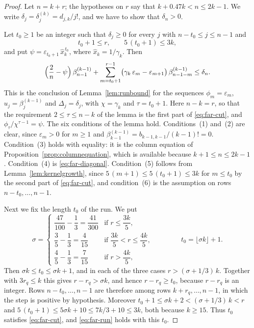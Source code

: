 \documentclass{amsart}
\theoremstyle{definition}
\theoremstyle{remark}
\numberwithin{equation}{section}
\begin{document}
\begin{proof}
Let $n=k+r$; the hypotheses on $r$ say that $k+0.47k<n\le2k-1$. We write
$\delta_j=\delta^{(k)}_j=d_{j,k}/j!$, and we have to show that $\delta_n>0$.

Let $t_0\ge1$ be an
integer such that $\delta_j\ge0$ for every $j$ with $n-t_0\le j\le n-1$ and
\begin{equation}\label{eq:far-cut}
t_0+1\le r,\qquad 5\,(t_0+1)\le3k,
\end{equation}
and put $\psi=\varepsilon_{t_0+1}\,\hat x_k^{\,t_0}$, where
$\hat x_k=1/\gamma_k$. Then
\begin{equation}\label{eq:far-run}
\Bigl(\frac2n-\psi\Bigr)\,\beta^{(k-1)}_{n-1}
+\sum_{m=t_0+1}^{r-1}\bigl(\gamma_k\,\varepsilon_m-\varepsilon_{m+1}\bigr)\,
\beta^{(k-1)}_{n-1-m}\le\delta_n .
\end{equation}
This is the conclusion of Lemma~\ref{lem:runbound} for the sequences
$\phi_m=\varepsilon_m$, $u_j=\beta^{(k-1)}_j$ and $\Delta_j=\delta_j$, with
$\chi=\gamma_k$ and $\tau=t_0+1$. Here $n-k=r$, so that the requirement
$2\le\tau\le n-k$ of the lemma is the first part of \eqref{eq:far-cut}, and
$\phi_\tau/\chi^{\tau-1}=\psi$. The six conditions of the lemma hold.
Conditions~(1) and~(2) are clear, since $\varepsilon_m>0$ for $m\ge1$ and
$\beta^{(k-1)}_{k-1}=b_{k-1,k-1}/(k-1)!=0$.
Condition~(3) holds with equality: it is the column equation of
Proposition~\ref{prop:columnequation}, which is available because
$k+1\le n\le2k-1$. Condition~(4) is \eqref{eq:far-diagonal}. Condition~(5)
follows from Lemma~\ref{lem:kernelgrowth}, since
$5\,(m+1)\le5\,(t_0+1)\le3k$ for $m\le t_0$ by the second part of
\eqref{eq:far-cut}, and condition~(6) is the assumption on rows
$n-t_0,\dots,n-1$.

Next we fix the length $t_0$ of the run. We put
\[
\sigma=
\begin{cases}
\dfrac{47}{100}-\dfrac13=\dfrac{41}{300}&\text{if }r\le\dfrac{3k}5,\\[2ex]
\dfrac35-\dfrac13=\dfrac4{15}&\text{if }\dfrac{3k}5<r\le\dfrac{4k}5,\\[2ex]
\dfrac45-\dfrac13=\dfrac7{15}&\text{if }r>\dfrac{4k}5,
\end{cases}
\qquad\qquad t_0=\lfloor\sigma k\rfloor+1 .
\]
Then $\sigma k\le t_0\le\sigma k+1$, and in each of the three cases
$r>(\sigma+1/3)\,k$. Together with $3r_q\le k$ this gives $r-r_q>\sigma k$,
and hence $r-r_q\ge t_0$, because $r-r_q$ is an integer. Rows
$n-t_0,\dots,n-1$ are therefore among rows $k+r_q,\dots,n-1$, in which
the step is positive by hypothesis. Moreover
$t_0+1\le\sigma k+2<(\sigma+1/3)\,k<r$ and
$5\,(t_0+1)\le5\sigma k+10\le7k/3+10\le3k$, both because $k\ge15$. Thus
$t_0$ satisfies \eqref{eq:far-cut}, and \eqref{eq:far-run} holds with this
$t_0$.


\end{proof}
\end{document}
